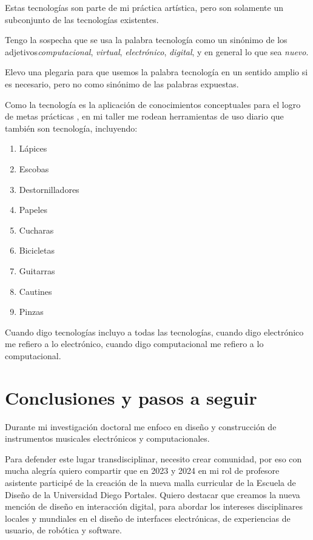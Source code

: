 \documentclass{article}
\begin{document}
Estas tecnologías son parte de mi práctica artística, pero son solamente un subconjunto de las tecnologías existentes.

Tengo la sospecha que se usa la palabra tecnología como un sinónimo de los adjetivos\textit{computacional}, \textit{virtual}, \textit{electrónico}, \textit{digital}, y en general lo que sea \textit{nuevo}.

Elevo una plegaria para que usemos la palabra tecnología en un sentido amplio si es necesario, pero no como sinónimo de las palabras expuestas.

Como la tecnología es la aplicación de conocimientos conceptuales para el logro de metas prácticas \cite{technology}, en mi taller me rodean herramientas de uso diario que también son tecnología, incluyendo:

\begin{enumerate}
    \item Lápices
    \item Escobas
    \item Destornilladores
    \item Papeles
    \item Cucharas
    \item Bicicletas
    \item Guitarras
    \item Cautines
    \item Pinzas
\end{enumerate}

Cuando digo tecnologías incluyo a todas las tecnologías, cuando digo electrónico me refiero a lo electrónico, cuando digo computacional me refiero a lo computacional.

\clearpage


\section{Conclusiones y pasos a seguir}

Durante mi investigación doctoral me enfoco en diseño y construcción de instrumentos musicales electrónicos y computacionales.

Para defender este lugar transdisciplinar, necesito crear comunidad, por eso con mucha alegría quiero compartir que en 2023 y 2024 en mi rol de profesore asistente participé de la creación de la nueva malla curricular de la Escuela de Diseño de la Universidad Diego Portales. Quiero destacar que creamos la nueva mención de diseño en interacción digital, para abordar los intereses disciplinares locales y mundiales en el diseño de interfaces electrónicas, de experiencias de usuario, de robótica y software.
\end{document}
